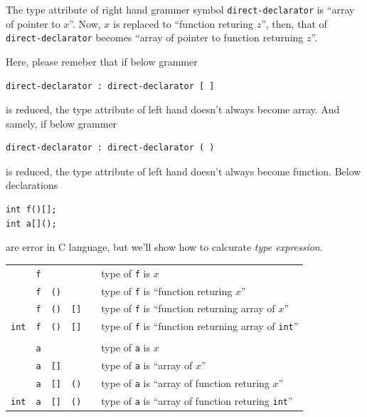 The type attribute of right hand grammer symbol {\tt{direct-declarator}}
is ``array of pointer to $x$''.
Now, $x$ is replaced to ``function returing $z$'',
then, that of {\tt{direct-declarator}} becomes
``array of pointer to function returning $z$''.

Here, please remeber that if below grammer
\begin{verbatim}
direct-declarator : direct-declarator [ ]
\end{verbatim}
is reduced, the type attribute of left hand doesn't always become
array. And samely, if below grammer
\begin{verbatim}
direct-declarator : direct-declarator ( )
\end{verbatim}
is reduced, the type attribute of left hand doesn't always become
function.
Below declarations
\begin{verbatim}
int f()[];
int a[]();
\end{verbatim}
are error in C language, but we'll show how to calcurate
{\em type expression}. 

\begin{tabular}{cccccl}
           & {\tt{f}} &           &           &    &
                 type of {\tt{f}} is $x$                       \\
           & {\tt{f}} & {\tt{()}} &           &    &
                 type of {\tt{f}} is ``function returing $x$'' \\
           & {\tt{f}} & {\tt{()}} & {\tt{[]}} &    &
                 type of {\tt{f}} is ``function returning array of $x$'' \\
{\tt{int}} & {\tt{f}} & {\tt{()}} & {\tt{[]}} &    &
            type of {\tt{f}} is ``function returning array of {\tt{int}}'' \\
           &          &           &           &    &
                                                         \\
           & {\tt{a}} &           &           &    &
                 type of {\tt{a}} is $x$                       \\
           & {\tt{a}} & {\tt{[]}} &           &    &
                 type of {\tt{a}} is ``array of $x$'' \\
           & {\tt{a}} & {\tt{[]}} & {\tt{()}} &    &
            type of {\tt{a}} is ``array of function returing $x$'' \\
{\tt{int}} & {\tt{a}} & {\tt{[]}} & {\tt{()}} &    &
            type of {\tt{a}} is ``array of function returing {\tt{int}}'' \\
\end{tabular}

